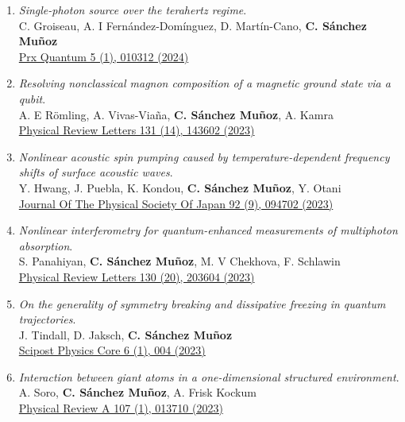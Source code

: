 \begin{enumerate}
 \item \emph{Single-photon source over the terahertz regime}.\\ 
{C. Groiseau, A. I Fernández-Domínguez, D. Martín-Cano, \textbf{C. Sánchez Muñoz}}\\ 
  \href{https://link.aps.org/doi/10.1103/PRXQuantum.5.010312}{{Prx Quantum 5 (1), 010312 (2024)}}

 \item \emph{Resolving nonclassical magnon composition of a magnetic ground state via a qubit}.\\ 
{A. E Römling, A. Vivas-Viaña, \textbf{C. Sánchez Muñoz}, A. Kamra}\\ 
  \href{https://journals.aps.org/prl/abstract/10.1103/PhysRevLett.131.143602}{{Physical Review Letters 131 (14), 143602 (2023)}}

 \item \emph{Nonlinear acoustic spin pumping caused by temperature-dependent frequency shifts of surface acoustic waves}.\\ 
{Y. Hwang, J. Puebla, K. Kondou, \textbf{C. Sánchez Muñoz}, Y. Otani}\\ 
  \href{https://journals.jps.jp/doi/abs/10.7566/JPSJ.92.094702}{{Journal Of The Physical Society Of Japan 92 (9), 094702 (2023)}}

 \item \emph{Nonlinear interferometry for quantum-enhanced measurements of multiphoton absorption}.\\ 
{S. Panahiyan, \textbf{C. Sánchez Muñoz}, M. V Chekhova, F. Schlawin}\\ 
  \href{https://journals.aps.org/prl/abstract/10.1103/PhysRevLett.130.203604}{{Physical Review Letters 130 (20), 203604 (2023)}}

 \item \emph{On the generality of symmetry breaking and dissipative freezing in quantum trajectories}.\\ 
{J. Tindall, D. Jaksch, \textbf{C. Sánchez Muñoz}}\\ 
  \href{https://www.scipost.org/SciPostPhysCore.6.1.004?acad_field_slug=politicalscience}{{Scipost Physics Core 6 (1), 004 (2023)}}

 \item \emph{Interaction between giant atoms in a one-dimensional structured environment}.\\ 
{A. Soro, \textbf{C. Sánchez Muñoz}, A. Frisk Kockum}\\ 
  \href{https://journals.aps.org/pra/abstract/10.1103/PhysRevA.107.013710}{{Physical Review A 107 (1), 013710 (2023)}}


\end{enumerate}
